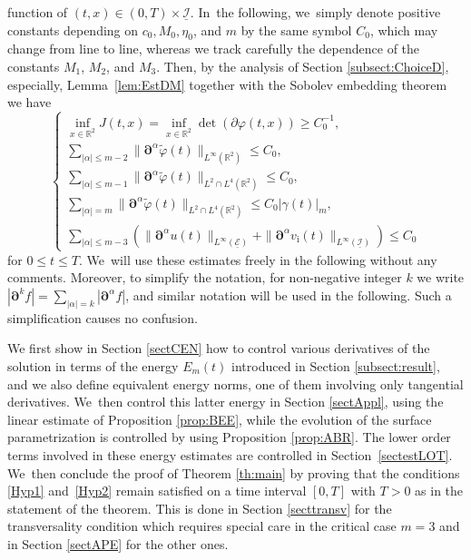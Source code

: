 \documentclass[JEP,XML,SOM,Unicode,NoFloatCountersInSection,published]{cedram}
\newcommand{\R}{{\mathbb R}}
\newcommand{\cI}{{\mathcal I}}
\newcommand{\cE}{{\mathcal E}}
\newcommand{\ul}[1]{\underline{#1}}
\theoremstyle{definition}
\begin{document}
function of $(t,x)\in(0,T)\times\ul{\cI}$. In~the following, we~simply denote positive constants depending on $c_0,M_0,\eta_0$, and $m$ by the same symbol $C_0$, which may change from line to line,
whereas we track carefully the dependence of the constants $M_1$, $M_2$, and $M_3$.
Then, by the analysis of Section \ref{subsect:ChoiceD}, especially, Lemma~\ref{lem:EstDM} together with the Sobolev embedding theorem we have
\[
\begin{cases}
\inf_{x\in\R^2}J(t,x) = \inf_{x\in\R^2}\det(\partial\varphi(t,x)) \geq C_0^{-1}, \\
\sum_{|\alpha| \leq m-2} \|\bm{\partial}^\alpha\widetilde{\varphi}(t)\|_{L^\infty(\R^2)} \leq C_0, \\
\sum_{|\alpha| \leq m-1} \|\bm{\partial}^\alpha\widetilde{\varphi}(t)\|_{L^2\cap L^4(\R^2)} \leq C_0, \\
\sum_{|\alpha| = m} \|\bm{\partial}^\alpha\widetilde{\varphi}(t)\|_{L^2\cap L^4(\R^2)} \leq C_0|\gamma(t)|_m, \\
\sum_{|\alpha| \leq m-3}(\|\bm{\partial}^\alpha u(t)\|_{L^\infty(\ul{\cE})} + \|\bm{\partial}^\alpha v_\mathrm{i}(t)\|_{L^\infty(\ul{\cI})}) \leq C_0
\end{cases}
\]
for $0\leq t\leq T$. We~will use these estimates freely in the following without any comments.
Moreover, to simplify the notation, for non-negative integer $k$ we write $|\bm{\partial}^k f|=\sum_{|\alpha|=k}|\bm{\partial}^\alpha f|$, and
similar notation will be used in the following.
Such a simplification causes no confusion.

We first show in Section \ref{sectCEN} how to control various derivatives of the solution in terms of the energy $E_m(t)$
introduced in Section \ref{subsect:result}, and we also define equivalent energy norms, one of them involving only tangential derivatives. We~then control this latter energy in Section \ref{sectAppl}, using the linear estimate of Proposition \ref{prop:BEE},
while the evolution of the surface parametrization is controlled by using Proposition \ref{prop:ABR}.
The lower order terms involved in these energy estimates are controlled in Section~\ref{sectestLOT}. We~then conclude the proof of Theorem \ref{th:main} by proving that the conditions \eqref{Hyp1} and~\eqref{Hyp2} remain satisfied
on a time interval $[0,T]$ with $T>0$ as in the statement of the theorem.
This is done in Section \ref{secttransv} for the transversality condition which requires special care in the critical case $m=3$
and in Section \ref{sectAPE} for the other ones.
\end{document}
